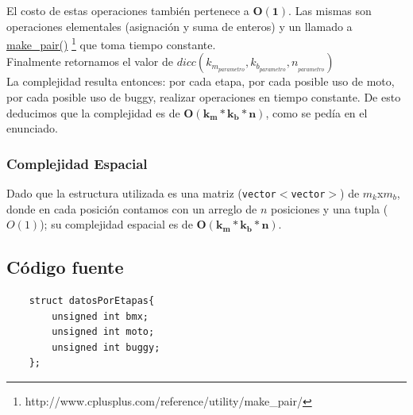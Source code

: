 El costo de estas operaciones tambi\'en pertenece a $\mathbf{O(1)}$. Las mismas son operaciones elementales (asignaci\'on y suma de enteros) y un llamado a  \href{http://www.cplusplus.com/reference/utility/make_pair/}{make\_pair()} \footnote{http://www.cplusplus.com/reference/utility/make_pair/} que toma tiempo constante.\\



Finalmente retornamos el valor de $dicc(k_{m_{parametro}},k_{b_{parametro}},n_{_{parametro}})$\\

La complejidad resulta entonces: por cada etapa, por cada posible uso de moto, por cada posible uso de buggy, realizar operaciones en tiempo constante. De esto deducimos que la complejidad es de $\mathbf{O(k_{m} * k_{b} * n)}$, como se ped\'ia en el enunciado.

\subsubsection{Complejidad Espacial}
Dado que la estructura utilizada es una matriz (\texttt{vector$<$vector$>$}) de $m_k$x$m_b$, donde en cada posici\'on contamos con un arreglo de $n$ posiciones y una tupla ($O(1)$); su complejidad espacial es de $\mathbf{O(k_m * k_b * n)}$.

\newpage
\subsection{C\'odigo fuente}
	\begin{codesnippet}
	\begin{verbatim}
    struct datosPorEtapas{
        unsigned int bmx;
        unsigned int moto;
        unsigned int buggy;
    };
	\end{verbatim}
	\end{codesnippet}

